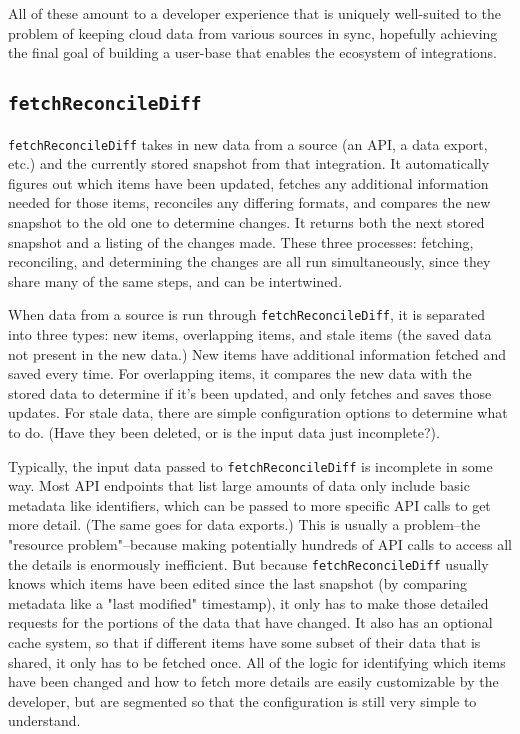 \documentclass[manuscript,review,anonymous]{acmart}
\begin{document}
All of these amount to a developer experience that is uniquely well-suited to the problem of keeping cloud data from various sources in sync, hopefully achieving the final goal of building a user-base that enables the ecosystem of integrations.

\subsection{\texttt{fetchReconcileDiff}}
\texttt{fetchReconcileDiff} takes in new data from a source (an API, a data export, etc.) and the currently stored snapshot from that integration. It automatically figures out which items have been updated, fetches any additional information needed for those items, reconciles any differing formats, and compares the new snapshot to the old one to determine changes. It returns both the next stored snapshot and a listing of the changes made. These three processes: fetching, reconciling, and determining the changes are all run simultaneously, since they share many of the same steps, and can be intertwined.\

When data from a source is run through \texttt{fetchReconcileDiff}, it is separated into three types: new items, overlapping items, and stale items (the saved data not present in the new data.) New items have additional information fetched and saved every time. For overlapping items, it compares the new data with the stored data to determine if it's been updated, and only fetches and saves those updates. For stale data, there are simple configuration options to determine what to do. (Have they been deleted, or is the input data just incomplete?).

Typically, the input data passed to \texttt{fetchReconcileDiff} is incomplete in some way. Most API endpoints that list large amounts of data only include basic metadata like identifiers, which can be passed to more specific API calls to get more detail. (The same goes for data exports.) This is usually a problem--the "resource problem"--because making potentially hundreds of API calls to access all the details is enormously inefficient. But because \texttt{fetchReconcileDiff} usually knows which items have been edited since the last snapshot (by comparing metadata like a "last modified" timestamp), it only has to make those detailed requests for the portions of the data that have changed. It also has an optional cache system, so that if different items have some subset of their data that is shared, it only has to be fetched once. All of the logic for identifying which items have been changed and how to fetch more details are easily customizable by the developer, but are segmented so that the configuration is still very simple to understand.
\end{document}
